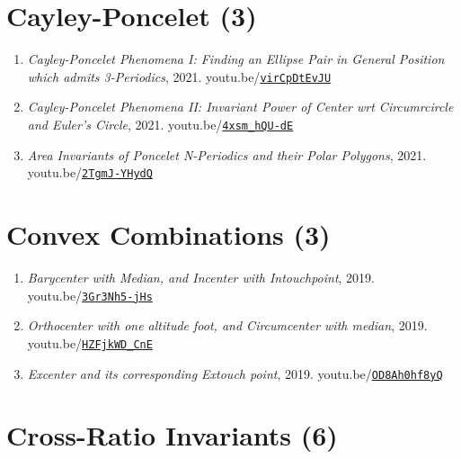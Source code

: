 \documentclass[12pt]{article}
\begin{document}
\section{Cayley-Poncelet (3)}

\begin{enumerate}[resume]
\item \textit{Cayley-Poncelet Phenomena I: Finding an Ellipse Pair in General Position which admits 3-Periodics}, 2021. youtu.be/\href{https://youtu.be/virCpDtEvJU}{\nolinkurl{virCpDtEvJU}}
\item \textit{Cayley-Poncelet Phenomena II: Invariant Power of Center wrt Circumrcircle and Euler's Circle}, 2021. youtu.be/\href{https://youtu.be/4xsm_hQU-dE}{\nolinkurl{4xsm\_hQU-dE}}
\item \textit{Area Invariants of Poncelet N-Periodics and their Polar Polygons}, 2021. youtu.be/\href{https://youtu.be/2TgmJ-YHydQ}{\nolinkurl{2TgmJ-YHydQ}}
\end{enumerate}

\section{Convex Combinations (3)}

\begin{enumerate}[resume]
\item \textit{Barycenter with Median, and Incenter with Intouchpoint}, 2019. youtu.be/\href{https://youtu.be/3Gr3Nh5-jHs}{\nolinkurl{3Gr3Nh5-jHs}}
\item \textit{Orthocenter with one altitude foot, and Circumcenter with median}, 2019. youtu.be/\href{https://youtu.be/HZFjkWD_CnE}{\nolinkurl{HZFjkWD\_CnE}}
\item \textit{Excenter and its corresponding Extouch point}, 2019. youtu.be/\href{https://youtu.be/OD8Ah0hf8yQ}{\nolinkurl{OD8Ah0hf8yQ}}
\end{enumerate}

\section{Cross-Ratio Invariants (6)}
\end{document}
